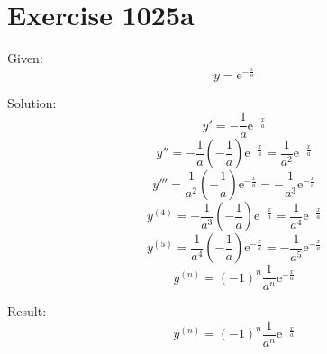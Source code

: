 \documentclass[a4paper, 10pt]{scrartcl}
\newcommand*\euler{\mathrm{e}}
\begin{document}
\section{Exercise 1025a}

Given:
\[
y = \euler^{-\frac{x}{a}}
\]

Solution:
\[
y' = -\frac{1}{a}\euler^{-\frac{x}{a}}
\]
\[
y'' = -\frac{1}{a}(-\frac{1}{a})\euler^{-\frac{x}{a}} = \frac{1}{a^{2}}\euler^{-\frac{x}{a}}
\]
\[
y''' = \frac{1}{a^{2}}(-\frac{1}{a})\euler^{-\frac{x}{a}} = -\frac{1}{a^{3}}\euler^{-\frac{x}{a}}
\]
\[
y^{(4)} = -\frac{1}{a^{3}}(-\frac{1}{a})\euler^{-\frac{x}{a}} = \frac{1}{a^{4}}\euler^{-\frac{x}{a}}
\]
\[
y^{(5)} = \frac{1}{a^{4}}(-\frac{1}{a})\euler^{-\frac{x}{a}} = -\frac{1}{a^{5}}\euler^{-\frac{x}{a}}
\]
\[
y^{(n)} = (-1)^{n}\frac{1}{a^{n}}\euler^{-\frac{x}{a}}
\]

Result:
\[
y^{(n)} = (-1)^{n}\frac{1}{a^{n}}\euler^{-\frac{x}{a}}
\]
\end{document}

